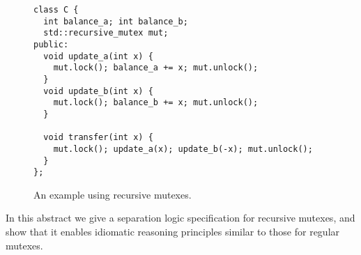 \documentclass[sigplan,screen]{acmart}
\begin{document}

\begin{figure}[h]
  \small
\begin{verbatim}
class C {
  int balance_a; int balance_b;
  std::recursive_mutex mut;
public:
  void update_a(int x) {
    mut.lock(); balance_a += x; mut.unlock();
  }
  void update_b(int x) {
    mut.lock(); balance_b += x; mut.unlock();
  }

  void transfer(int x) {
    mut.lock(); update_a(x); update_b(-x); mut.unlock();
  }
};
\end{verbatim}
  \caption{An example using recursive mutexes.}
  \label{fig:rec-mutex}
\end{figure}

In this abstract we give a separation logic specification for recursive mutexes, and show that it enables idiomatic reasoning principles similar to those for regular mutexes.
\end{document}
